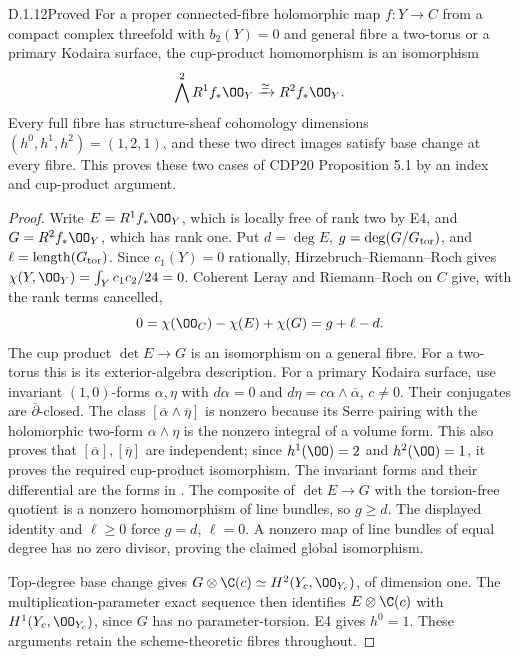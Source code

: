 \begin{idstatement}{D.1.12}{Proved}\label{st:D.1.12}
For a proper connected-fibre holomorphic map $f:Y\to C$ from a
compact complex threefold with $b_2(Y)=0$ and general fibre a
two-torus or a primary Kodaira surface, the cup-product homomorphism
is an isomorphism
\[
\bigwedge^2R^1f_*\OO_Y\xrightarrow{\simeq}R^2f_*\OO_Y.
\]
Every full fibre has structure-sheaf cohomology dimensions
$(h^0,h^1,h^2)=(1,2,1)$, and these two direct images satisfy
base change at every fibre. This proves these two cases of CDP20
Proposition 5.1 by an index and cup-product argument.
\end{idstatement}
\begin{proof}
Write $E=R^1f_*\OO_Y$, which is locally free of rank two by E4,
and $G=R^2f_*\OO_Y$, which has rank one. Put
$d=\deg E$, $g=\deg(G/G_{\rm tor})$, and
$\ell=\operatorname{length}(G_{\rm tor})$.
Since $c_1(Y)=0$ rationally, Hirzebruch--Riemann--Roch gives
$\chi(Y,\OO_Y)=\int_Yc_1c_2/24=0$.
Coherent Leray and Riemann--Roch on $C$ give, with the rank terms
cancelled,
\[
0=\chi(\OO_C)-\chi(E)+\chi(G)=g+\ell-d.
\]
The cup product $\det E\to G$ is an isomorphism on a general
fibre. For a two-torus this is its exterior-algebra description.
For a primary Kodaira surface, use invariant $(1,0)$-forms
$\alpha,\eta$ with $d\alpha=0$ and
$d\eta=c\alpha\wedge\overline\alpha$, $c\ne0$.
Their conjugates are $\overline\partial$-closed. The class
$[\overline\alpha\wedge\overline\eta]$ is nonzero because its
Serre pairing with the holomorphic two-form $\alpha\wedge\eta$
is the nonzero integral of a volume form. This also proves that
$[\overline\alpha],[\overline\eta]$ are independent; since
$h^1(\OO)=2$ and $h^2(\OO)=1$, it proves the required cup-product
isomorphism. The invariant forms and their differential are
the forms in \cite[\S3, equations (9)--(12)]{Borcea1984}.
The composite of $\det E\to G$ with the torsion-free quotient is a
nonzero homomorphism of line bundles, so $g\geq d$. The displayed
identity and $\ell\geq0$ force $g=d$, $\ell=0$. A nonzero map
of line bundles of equal degree has no zero divisor, proving the
claimed global isomorphism.

Top-degree base change gives
$G\otimes\C(c)\simeq H^2(Y_c,\OO_{Y_c})$, of dimension one.
The multiplication-parameter exact sequence then identifies
$E\otimes\C(c)$ with $H^1(Y_c,\OO_{Y_c})$, since $G$ has no
parameter-torsion. E4 gives $h^0=1$. These arguments retain the
scheme-theoretic fibres throughout.
\end{proof}



